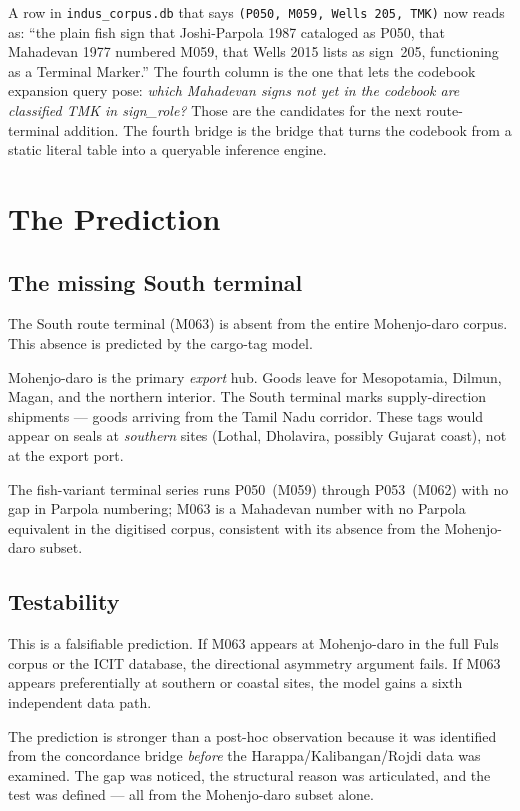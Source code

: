 A row in \texttt{indus\_corpus.db} that says
\texttt{(P050, M059, Wells~205, TMK)} now reads as: ``the plain
fish sign that Joshi-Parpola 1987 cataloged as P050, that Mahadevan
1977 numbered M059, that Wells 2015 lists as sign~205, functioning
as a Terminal Marker.'' The fourth column is the one that lets the
codebook expansion query pose: \emph{which Mahadevan signs not yet
in the codebook are classified TMK in sign\_role?} Those are the
candidates for the next route-terminal addition. The fourth bridge
is the bridge that turns the codebook from a static literal table
into a queryable inference engine.

\section{The Prediction}

\subsection{The missing South terminal}

The South route terminal (M063) is absent from the entire
Mohenjo-daro corpus.
This absence is predicted by the cargo-tag model.

Mohenjo-daro is the primary \emph{export} hub. Goods leave for
Mesopotamia, Dilmun, Magan, and the northern interior. The South
terminal marks supply-direction shipments --- goods arriving from
the Tamil Nadu corridor. These tags would appear on seals at
\emph{southern} sites (Lothal, Dholavira, possibly Gujarat coast),
not at the export port.

The fish-variant terminal series runs P050~(M059) through
P053~(M062) with no gap in Parpola numbering; M063 is a Mahadevan
number with no Parpola equivalent in the digitised corpus,
consistent with its absence from the Mohenjo-daro subset.

\subsection{Testability}

This is a falsifiable prediction. If M063 appears at Mohenjo-daro
in the full Fuls corpus or the ICIT database, the directional
asymmetry argument fails. If M063 appears preferentially at
southern or coastal sites, the model gains a sixth independent
data path.

The prediction is stronger than a post-hoc observation because it
was identified from the concordance bridge \emph{before} the
Harappa/Kalibangan/Rojdi data was examined. The gap was noticed,
the structural reason was articulated, and the test was defined ---
all from the Mohenjo-daro subset alone.

